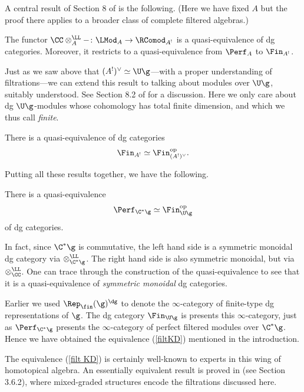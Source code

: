 \documentclass[10pt]{amsart}
\begin{document}
A central result of Section 8 of \cite{CosYang} is the following.
(Here we have fixed $A$ but the proof there applies to a broader class of complete filtered algebras.)

\begin{prp}
The functor $\CC \otimes^\LL_A - \colon \LMod_A \to \RComod_{A^!}$ is a quasi-equivalence of dg categories.
Moreover, it restricts to a quasi-equivalence from $\Perf_A$ to $\Fin_{A^!}$.
\end{prp}

Just as we saw above that $(A^!)^\vee \simeq \U\g$---with a proper understanding of filtrations---we can extend this result to talking about modules over $\U\g$, suitably understood.
See Section 8.2 of \cite{CosYang} for a discussion.
Here we only care about dg $\U\g$-modules whose cohomology has total finite dimension,
and which we thus call {\em finite}.

\def\op{{\rm op}}

\begin{prp}
There is a quasi-equivalence of dg categories
\[
\Fin_{A^!} \simeq \Fin_{(A^!)^\vee}^\op.
\]
\end{prp}

Putting all these results together, we have the following.

\begin{crl}
\label{filt KD}
There is a quasi-equivalence 
\[
\Perf_{\C^*\g} \simeq \Fin_{\U\g}^\op
\]
of dg categories.
\end{crl}

In fact, since $\C^*\g$ is commutative, 
the left hand side is a symmetric monoidal dg category via $\otimes^\LL_{\C^*\g}$.
The right hand side is also symmetric monoidal, but via $\otimes^\LL_\CC$.
One can trace through the construction of the quasi-equivalence to see that it is a quasi-equivalence of {\em symmetric monoidal} dg categories.

Earlier we used $\Rep_\fin(\g)^\dg$ to denote the $\infty$-category of finite-type dg representations of $\g$.
The dg category $\Fin_{\U\g}$ is presents this $\infty$-category,
just as $\Perf_{\C^*\g}$ presents the $\infty$-category of perfect filtered modules over $\C^*\g$.
Hence we have obtained the equivalence (\ref{filtKD}) mentioned in the introduction.

\begin{rmk}
The equivalence (\ref{filt KD}) is certainly well-known to experts in this wing of homotopical algebra.
An essentially equivalent result is proved in \cite{CPTVV} (see Section 3.6.2),
where mixed-graded structures encode the filtrations discussed here.
\end{rmk}
\end{document}
